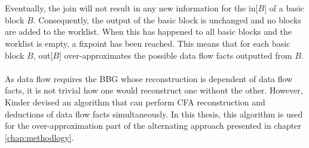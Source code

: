 \documentclass{kththesis}
\begin{document}
\\ \\
Eventually, the join will not result in any new information for the in[$B$] of a basic block $B$. Consequently, the output of the basic block is unchanged and no blocks are added to the worklist. When this has happened to all basic blocks and the worklist is empty, a fixpoint has been reached. This means that for each basic block $B$, out[$B$] over-approximates the possible data flow facts outputted from $B$.
\\ \\
As data flow requires the BBG whose reconstruction is dependent of data flow facts, it is not trivial how one would reconstruct one without the other. However, Kinder\cite{Jakstab} devised an algorithm that can perform CFA reconstruction and deductions of data flow facts simultaneously. In this thesis, this algorithm is used for the over-approximation part of the alternating approach presented in chapter \ref{chap:methodlogy}.
\end{document}
